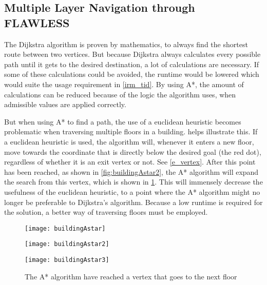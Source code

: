 \subsection{Multiple Layer Navigation through FLAWLESS} \label{multlayhan}

The Dijkstra algorithm is proven by mathematics, to always find the shortest route between two vertices. But because Dijkstra always calculates every possible path until it gets to the desired destination, a lot of calculations are necessary. If some of these calculations could be avoided, the runtime would be lowered which would suite the usage requirement in \cref{irm_tid}. By using A*, the amount of calculations can be reduced because of the logic the algorithm uses, when admissible values are applied correctly.

But when using A* to find a path, the use of a euclidean heuristic becomes problematic when traversing multiple floors in a building.  helps illustrate this. If a euclidean heuristic is used, the algorithm will, whenever it enters a new floor, move towards the coordinate that is directly below the desired goal (the red dot), regardless of whether it is an exit vertex or not. See \cref{e_vertex}. After this point has been reached, as shown in \cref{fig:buildingAstar2}, the A* algorithm will expand the search from this vertex, which is shown in \cref{fig:buildingAstar3}. This will immensely decrease the usefulness of the euclidean heuristic, to a point where the A* algorithm might no longer be preferable to Dijkstra's algorithm. Because a low runtime is required for the solution, a better way of traversing floors must be employed.


\begin{figure}
\centering
  \begin{minipage}{0.45\textwidth}
    \centering
    \texttt{[image: buildingAstar]}
    \caption{Step 1: How the A* algorithm would expand, if using the euclidean distance as heuristic}
    \label{fig:buildingAstar1}
  \end{minipage}
  \hfill
  \begin{minipage}{0.45\textwidth}
    \centering
    \texttt{[image: buildingAstar2]}
    \caption{The A* algorithm will expand the search from this vertex\newline}
    \label{fig:buildingAstar2}
  \end{minipage}
  \hfill
  \begin{minipage}{0.45\textwidth}
    \raggedright
    \texttt{[image: buildingAstar3]}
    \caption{The A* algorithm have reached a vertex that goes to the next floor}
    \label{fig:buildingAstar3}
  \end{minipage}
\end{figure}


